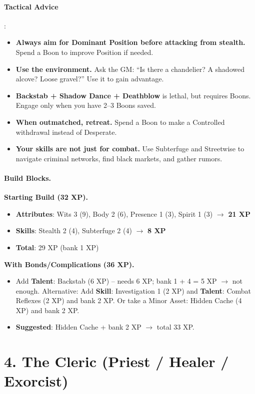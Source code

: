 \paragraph{Tactical Advice}:
\begin{itemize}
\item \textbf{Always aim for Dominant Position before attacking from stealth.} Spend a Boon to improve Position if needed.
\item \textbf{Use the environment.} Ask the GM: ``Is there a chandelier? A shadowed alcove? Loose gravel?'' Use it to gain advantage.
\item \textbf{Backstab + Shadow Dance + Deathblow} is lethal, but requires Boons. Engage only when you have 2--3 Boons saved.
\item \textbf{When outmatched, retreat.} Spend a Boon to make a Controlled withdrawal instead of Desperate.
\item \textbf{Your skills are not just for combat.} Use Subterfuge and Streetwise to navigate criminal networks, find black markets, and gather rumors.
\end{itemize}

\paragraph{Build Blocks.}
\textbf{Starting Build (32 XP).}
\begin{itemize}
\item \textbf{Attributes}: Wits 3 (9), Body 2 (6), Presence 1 (3), Spirit 1 (3) \(\rightarrow\) \textbf{21 XP}
\item \textbf{Skills}: Stealth 2 (4), Subterfuge 2 (4) \(\rightarrow\) \textbf{8 XP}
\item \textbf{Total}: 29 XP (bank 1 XP)
\end{itemize}
\textbf{With Bonds/Complications (36 XP).}
\begin{itemize}
\item Add \textbf{Talent}: Backstab (6 XP) -- needs 6 XP; bank 1 + 4 = 5 XP $\rightarrow$ not enough. Alternative: Add \textbf{Skill}: Investigation 1 (2 XP) and \textbf{Talent}: Combat Reflexes (2 XP) and bank 2 XP. Or take a Minor Asset: Hidden Cache (4 XP) and bank 2 XP.
\item \textbf{Suggested}: Hidden Cache + bank 2 XP $\rightarrow$ total 33 XP.
\end{itemize}

\section{4. The Cleric (Priest / Healer / Exorcist)}
\label{sec:concept-cleric}

